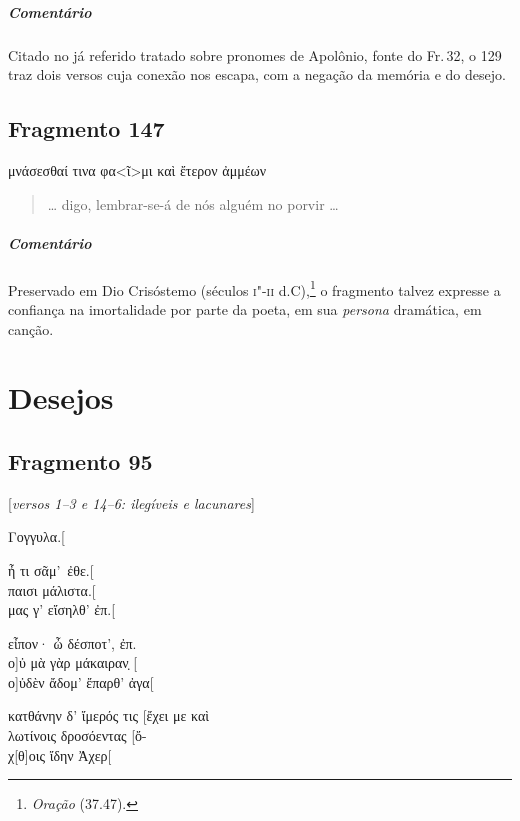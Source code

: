 \medskip

\paragraph{Comentário}
Citado no já referido tratado sobre pronomes de Apolônio, fonte do Fr.\,32, o 129 traz dois versos cuja conexão nos escapa, com a negação da memória e do desejo.


\section{Fragmento 147}

\begin{gkverse}
μνάσεσθαί τινα φα<ῖ>μι \dagger{}καὶ ἔτερον\dagger{} ἀμμέων
\end{gkverse}

\begin{verse}
\ldots{} digo, lembrar-se-á de nós alguém no porvir \ldots{}
\end{verse}

\medskip

{\paragraph{Comentário} Preservado em Dio Crisóstemo (séculos \textsc{i"-ii} d.C),\footnote{\textit{Oração} (37.47).} o fragmento talvez expresse a confiança na imortalidade por parte da poeta, em sua \textit{persona} dramática, em canção.}


\chapter{Desejos}

\section{Fragmento 95}

\begin{gkverse}
\textnormal{[\textit{versos 1--3 e 14--6: ilegíveis e lacunares}]}

Γογγυλα.[

ἦ τι σᾶμ’ ἐθε.[\\
παισι μάλιστα.[\\
μας γ’ εἴσηλθ’ ἐπ.[

εἶπον· ὦ δέσποτ’, ἐπ.\\
ο]ὐ μὰ γὰρ μάκαιραν̣ [\\
ο]ὐδὲν ἄδομ’ ἔπαρθ’ ἀγα[

κατθάνην δ’ ἴμερός τις [ἔχει με καὶ\\
λωτίνοις δροσόεντας [ὄ-\\
χ[θ]οις ἴδην Ἀχερ[
\end{gkverse}

